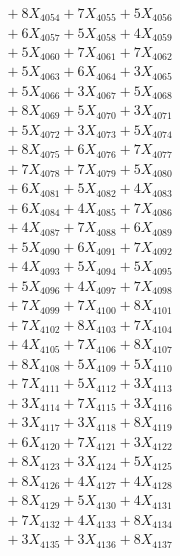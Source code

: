 \documentclass[a4paper,10pt]{article}
\begin{document}
{\begin{align}
&\;  + 8 X_{4054} + 7 X_{4055} + 5 X_{4056} \\[0.3ex]
&\;  + 6 X_{4057} + 5 X_{4058} + 4 X_{4059} \\[0.5ex]\allowbreak
&\;  + 5 X_{4060} + 7 X_{4061} + 7 X_{4062} \\[0.3ex]
&\;  + 5 X_{4063} + 6 X_{4064} + 3 X_{4065} \\[0.3ex]
&\;  + 5 X_{4066} + 3 X_{4067} + 5 X_{4068} \\[0.3ex]
&\;  + 8 X_{4069} + 5 X_{4070} + 3 X_{4071} \\[0.3ex]
&\;  + 5 X_{4072} + 3 X_{4073} + 5 X_{4074} \\[0.3ex]
&\;  + 8 X_{4075} + 6 X_{4076} + 7 X_{4077} \\[0.3ex]
&\;  + 7 X_{4078} + 7 X_{4079} + 5 X_{4080} \\[0.3ex]
&\;  + 6 X_{4081} + 5 X_{4082} + 4 X_{4083} \\[0.3ex]
&\;  + 6 X_{4084} + 4 X_{4085} + 7 X_{4086} \\[0.3ex]
&\;  + 4 X_{4087} + 7 X_{4088} + 6 X_{4089} \\[0.5ex]\allowbreak
&\;  + 5 X_{4090} + 6 X_{4091} + 7 X_{4092} \\[0.3ex]
&\;  + 4 X_{4093} + 5 X_{4094} + 5 X_{4095} \\[0.3ex]
&\;  + 5 X_{4096} + 4 X_{4097} + 7 X_{4098} \\[0.3ex]
&\;  + 7 X_{4099} + 7 X_{4100} + 8 X_{4101} \\[0.3ex]
&\;  + 7 X_{4102} + 8 X_{4103} + 7 X_{4104} \\[0.3ex]
&\;  + 4 X_{4105} + 7 X_{4106} + 8 X_{4107} \\[0.3ex]
&\;  + 8 X_{4108} + 5 X_{4109} + 5 X_{4110} \\[0.3ex]
&\;  + 7 X_{4111} + 5 X_{4112} + 3 X_{4113} \\[0.3ex]
&\;  + 3 X_{4114} + 7 X_{4115} + 3 X_{4116} \\[0.3ex]
&\;  + 3 X_{4117} + 3 X_{4118} + 8 X_{4119} \\[0.5ex]\allowbreak
&\;  + 6 X_{4120} + 7 X_{4121} + 3 X_{4122} \\[0.3ex]
&\;  + 8 X_{4123} + 3 X_{4124} + 5 X_{4125} \\[0.3ex]
&\;  + 8 X_{4126} + 4 X_{4127} + 4 X_{4128} \\[0.3ex]
&\;  + 8 X_{4129} + 5 X_{4130} + 4 X_{4131} \\[0.3ex]
&\;  + 7 X_{4132} + 4 X_{4133} + 8 X_{4134} \\[0.3ex]
&\;  + 3 X_{4135} + 3 X_{4136} + 8 X_{4137} \\[0.3ex]

\end{align}}
\end{document}
